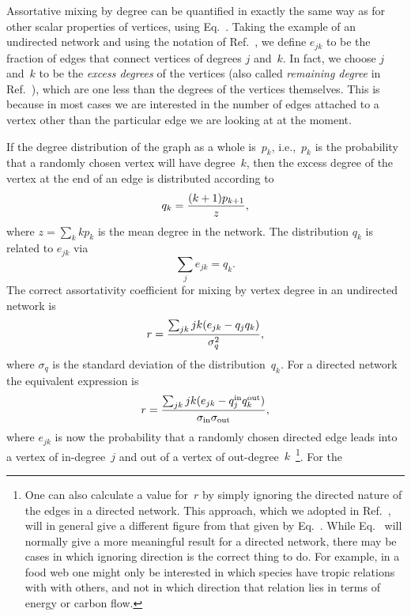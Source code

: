 \documentclass[twocolumn,pre]{revtex4}
\begin{document}
Assortative mixing by degree can be quantified in exactly the same way as
for other scalar properties of vertices, using Eq.~.  Taking
the example of an undirected network and using the notation of
Ref.~, we define $e_{jk}$ to be the fraction of edges
that connect vertices of degrees $j$ and~$k$.  In fact, we choose $j$
and~$k$ to be the \textit{excess degrees} of the vertices (also called
\textit{remaining degree} in Ref.~), which are one
less than the degrees of the vertices themselves.  This is because in most
cases we are interested in the number of edges attached to a vertex other
than the particular edge we are looking at at the moment.

If the degree distribution of the graph as a whole is~$p_k$, i.e.,~$p_k$ is
the probability that a randomly chosen vertex will have degree~$k$, then
the excess degree of the vertex at the end of an edge is distributed
according to~\cite{NSW01}
\begin{equation}
q_k = {(k+1) p_{k+1}\over z},
\label{defsqk}
\end{equation}
where $z=\sum_k k p_k$ is the mean degree in the network.  The distribution
$q_k$ is related to $e_{jk}$ via
\begin{equation}
\sum_j e_{jk} = q_k.
\label{degreesum}
\end{equation}
The correct assortativity coefficient for mixing by vertex degree in an
undirected network is
\begin{equation}
r = {\sum_{jk} jk(e_{jk}-q_jq_k)\over\sigma_q^2},
\end{equation}
where $\sigma_q$ is the standard deviation of the distribution~$q_k$.  For
a directed network the equivalent expression is
\begin{equation}
r = {\sum_{jk} jk(e_{jk}-q^{\rm in}_jq^{\rm out}_k)\over
     \sigma_{\rm in}\sigma_{\rm out}},
\label{rdir}
\end{equation}
where $e_{jk}$ is now the probability that a randomly chosen directed edge
leads into a vertex of in-degree~$j$ and out of a vertex of
out-degree~$k$~\footnote{One can also calculate a value for~$r$ by simply
ignoring the directed nature of the edges in a directed network.  This
approach, which we adopted in Ref.~, will in general
give a different figure from that given by Eq.~.  While
Eq.~ will normally give a more meaningful result for a directed
network, there may be cases in which ignoring direction is the correct
thing to do.  For example, in a food web one might only be interested in
which species have tropic relations with with others, and not in which
direction that relation lies in terms of energy or carbon flow.}.  For the
\end{document}

